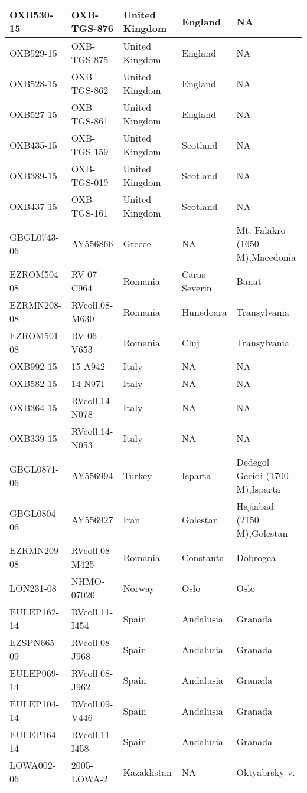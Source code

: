 \documentclass[12pt,]{article}
\begin{document}
\begin{landscape}
\begin{longtable}{l|l|l|l|l}
\hline
OXB530-15 & OXB-TGS-876 & United Kingdom & England & NA\\
\hline
OXB529-15 & OXB-TGS-875 & United Kingdom & England & NA\\
\hline
OXB528-15 & OXB-TGS-862 & United Kingdom & England & NA\\
\hline
OXB527-15 & OXB-TGS-861 & United Kingdom & England & NA\\
\hline
OXB435-15 & OXB-TGS-159 & United Kingdom & Scotland & NA\\
\hline
OXB389-15 & OXB-TGS-019 & United Kingdom & Scotland & NA\\
\hline
OXB437-15 & OXB-TGS-161 & United Kingdom & Scotland & NA\\
\hline
GBGL0743-06 & AY556866 & Greece & NA & Mt. Falakro (1650 M),Macedonia\\
\hline
EZROM504-08 & RV-07-C964 & Romania & Caras-Severin & Banat\\
\hline
EZRMN208-08 & RVcoll.08-M630 & Romania & Hunedoara & Transylvania\\
\hline
EZROM501-08 & RV-06-V653 & Romania & Cluj & Transylvania\\
\hline
OXB992-15 & 15-A942 & Italy & NA & NA\\
\hline
OXB582-15 & 14-N971 & Italy & NA & NA\\
\hline
OXB364-15 & RVcoll.14-N078 & Italy & NA & NA\\
\hline
OXB339-15 & RVcoll.14-N053 & Italy & NA & NA\\
\hline
GBGL0871-06 & AY556994 & Turkey & Isparta & Dedegol Gecidi (1700 M),Isparta\\
\hline
GBGL0804-06 & AY556927 & Iran & Golestan & Hajiabad (2150 M),Golestan\\
\hline
EZRMN209-08 & RVcoll.08-M425 & Romania & Constanta & Dobrogea\\
\hline
LON231-08 & NHMO-07020 & Norway & Oslo & Oslo\\
\hline
EULEP162-14 & RVcoll.11-I454 & Spain & Andalusia & Granada\\
\hline
EZSPN665-09 & RVcoll.08-J968 & Spain & Andalusia & Granada\\
\hline
EULEP069-14 & RVcoll.08-J962 & Spain & Andalusia & Granada\\
\hline
EULEP104-14 & RVcoll.09-V446 & Spain & Andalusia & Granada\\
\hline
EULEP164-14 & RVcoll.11-I458 & Spain & Andalusia & Granada\\
\hline
LOWA002-06 & 2005-LOWA-2 & Kazakhstan & NA & Oktyabrsky v.\\

\end{longtable}
\end{landscape}
\end{document}
